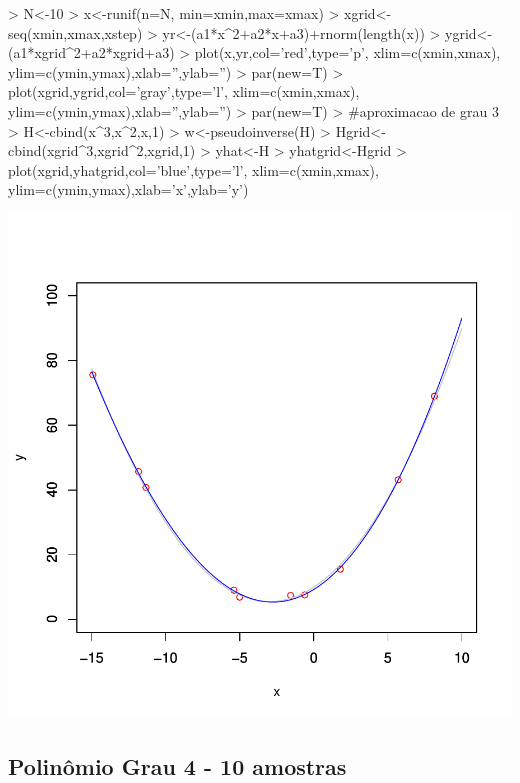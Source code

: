 \documentclass{article}
\begin{document}
\begin{Schunk}
\begin{Sinput}
>   N<-10
>   x<-runif(n=N, min=xmin,max=xmax)
>   xgrid<-seq(xmin,xmax,xstep)
>   yr<-(a1*x^2+a2*x+a3)+rnorm(length(x))
>   ygrid<-(a1*xgrid^2+a2*xgrid+a3)
>   plot(x,yr,col='red',type='p', xlim=c(xmin,xmax), ylim=c(ymin,ymax),xlab='',ylab='')
>   par(new=T)
>   plot(xgrid,ygrid,col='gray',type='l', xlim=c(xmin,xmax), ylim=c(ymin,ymax),xlab='',ylab='')
>   par(new=T)
>   #aproximacao de grau 3
>   H<-cbind(x^3,x^2,x,1)
>   w<-pseudoinverse(H) %
>   Hgrid<-cbind(xgrid^3,xgrid^2,xgrid,1)
>   yhat<-H%
>   yhatgrid<-Hgrid%
>   plot(xgrid,yhatgrid,col='blue',type='l', xlim=c(xmin,xmax), ylim=c(ymin,ymax),xlab='x',ylab='y')
\end{Sinput}
\end{Schunk}
\includegraphics{aproximacao_polinomial-004}

\newpage
\subsection{Polinômio Grau 4 - 10 amostras}
\end{document}
